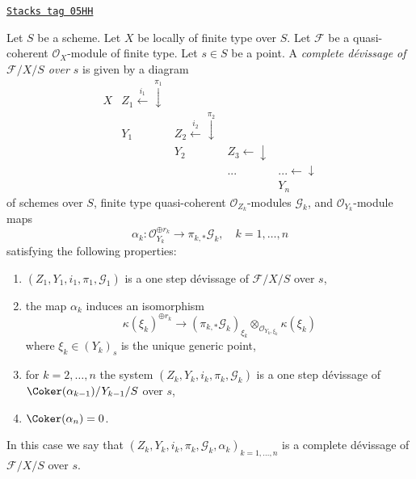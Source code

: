 \begin{definition}
\label{flat-definition-complete-devissage}
\href{https://stacks.math.columbia.edu/tag/05HH}{\texttt{Stacks tag 05HH}}

Let $S$ be a scheme.
Let $X$ be locally of finite type over $S$.
Let $\mathcal{F}$ be a quasi-coherent $\mathcal{O}_X$-module of finite type.
Let $s \in S$ be a point.
A {\it complete d\'evissage of $\mathcal{F}/X/S$ over $s$} is given by a
diagram
$$
\begin{array}{ccccc}X & Z_1 \overset{i_1}{\longleftarrow}\overset{\pi_1}{\downarrow} &  &  &  \\  & Y_1 & Z_2 \overset{i_2}{\longleftarrow}\overset{\pi_2}{\downarrow} &  &  \\  &  & Y_2 & Z_3 \longleftarrow\downarrow &  \\  &  &  & ... & ... \longleftarrow\downarrow \\  &  &  &  & Y_n\end{array}
$$
of schemes over $S$, finite type quasi-coherent $\mathcal{O}_{Z_k}$-modules
$\mathcal{G}_k$, and $\mathcal{O}_{Y_k}$-module maps
$$
\alpha_k :
\mathcal{O}_{Y_k}^{\oplus r_k}
\longrightarrow
\pi_{k, *}\mathcal{G}_k,
\quad
k = 1, \ldots, n
$$
satisfying the following properties:
\begin{enumerate}
\item $(Z_1, Y_1, i_1, \pi_1, \mathcal{G}_1)$ is a one step
d\'evissage of $\mathcal{F}/X/S$ over $s$,
\item the map $\alpha_k$ induces an isomorphism
$$
\kappa(\xi_k)^{\oplus r_k} \longrightarrow
(\pi_{k, *}\mathcal{G}_k)_{\xi_k}
\otimes_{\mathcal{O}_{Y_k, \xi_k}} \kappa(\xi_k)
$$
where $\xi_k \in (Y_k)_s$ is the unique generic point,
\item for $k = 2, \ldots, n$ the system
$(Z_k, Y_k, i_k, \pi_k, \mathcal{G}_k)$
is a one step d\'evissage of $\Coker(\alpha_{k - 1})/Y_{k - 1}/S$
over $s$,
\item $\Coker(\alpha_n) = 0$.
\end{enumerate}
In this case we say that
$(Z_k, Y_k, i_k, \pi_k, \mathcal{G}_k, \alpha_k)_{k = 1, \ldots, n}$
is a complete d\'evissage of $\mathcal{F}/X/S$ over $s$.
\end{definition}

